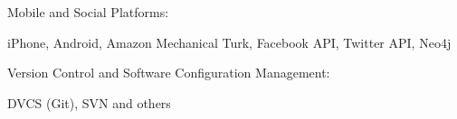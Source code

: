 \documentclass[10pt]{article}
\renewcommand{\section}[2]%
        {\pagebreak[3]\vspace{1.3\baselineskip}%
         \phantomsection\addcontentsline{toc}{section}{#1}%
         \hspace{0in}%
         \marginpar{
         \raggedright \scshape #1}#2}
\newenvironment{innerlist}[1][\enskip\textbullet]%
        {\begin{compactitem}[#1]}{\end{compactitem}}
\newcommand{\halfblankline}{\quad\vspace{-0.5\baselineskip}\pagebreak[3]}
\providecommand\BibTeX{{B\kern-.05em{\sc i\kern-.025em b}\kern-.08em
    \TeX}}
\begin{document}
Mobile and Social Platforms:
%
\begin{innerlist}
    \item iPhone, Android, Amazon Mechanical Turk, Facebook API, Twitter API, Neo4j
\end{innerlist}
%
\halfblankline

Version Control and Software Configuration Management:
%
\begin{innerlist}
    \item DVCS (Git), SVN and
        others
\end{innerlist}

\halfblankline


%


%


%
%




\end{document}

